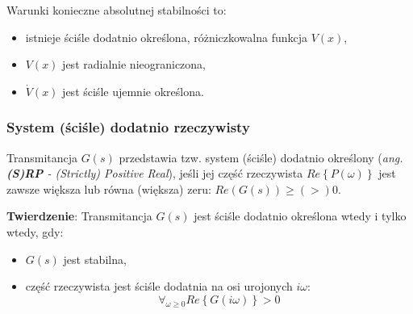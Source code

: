 \documentclass{article}
\begin{document}
        Warunki konieczne absolutnej stabilności to:
        \begin{itemize}
            \item istnieje ściśle dodatnio określona, różniczkowalna funkcja $V(x)$,
            \item $V(x)$ jest radialnie nieograniczona,
            \item $\dot{V}(x)$ jest ściśle ujemnie określona.
        \end{itemize}

        \subsubsection{System (ściśle) dodatnio rzeczywisty}\label{sec:spr}
        Transmitancja $G(s)$ przedstawia tzw. system (ściśle) dodatnio określony (\textit{ang.} \textit{\textbf{(S)RP} - (Strictly) Positive Real}), jeśli jej część rzeczywista $Re\left\{P(\omega)\right\}$ jest zawsze większa lub równa (większa) zeru: $Re(G(s)) \geq (>) 0$.

        \textbf{Twierdzenie}: Transmitancja $G(s)$ jest ściśle dodatnio określona wtedy i tylko wtedy, gdy:
        \begin{itemize}
            \item $G(s)$ jest stabilna,
            \item część rzeczywista jest ściśle dodatnia na osi urojonych $i\omega$:
            $$
                \forall_{\omega \geq 0}Re\left\{ G(i\omega) \right\} > 0
            $$
        \end{itemize}
\end{document}
